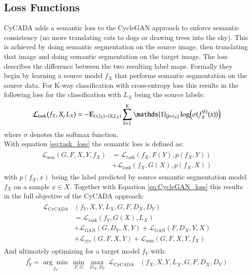 \subsection{Loss Functions}
CyCADA \cite{DBLP:journals/corr/abs-1711-03213} adds a semantic loss to the CycleGAN approach to enforce semantic consistency (no more translating cats to dogs or drawing trees into the sky). This is achieved by doing semantic segmentation on the source image, then translating that image and doing semantic segmentation on the target image. The loss describes the difference between the two resulting label maps. Formally they begin by learning a source model $f_X$ that performs semantic segmentation on the source data. For K-way classification with cross-entropy loss this results in the following loss for the classification with $L_X$ being the source labels:
\begin{align}
	\mathcal{L}_{\text{task}}(f_X, X, L_X) = -\mathbb{E}_{(x, l_X)\sim(X, L_X)}\sum_{k=1}^{K}\mathds{1}_{[k=l_X]}\log\Bigl(\sigma(f_X^{(k)}(x))\Bigr) \label{eq:task_loss} 
\end{align}
where $\sigma$ denotes the softmax function.\\
With equation \ref{eq:task_loss} the semantic loss is defined as:
\begin{align}
	\begin{split}
		\mathcal{L}_{\text{sem}}(G, F, X, Y, f_X) &= \mathcal{L}_{\text{task}}(f_X, F(Y), p(f_X, Y))\\
		&+ \mathcal{L}_{\text{task}}(f_X, G(X), p(f_X, X))
	\end{split}
\end{align}
with $p(f_X, x)$ being the label predicted by source semantic segmentation model $f_X$ on a sample $x \in X$. Together with Equation \ref{eq:CycleGAN_loss} this results in the full objective of the CyCADA approach:
\begin{align}
	\begin{split}
		\mathcal{L}_{\text{CyCADA}}&(f_Y, X, Y, L_X, G, F, D_X, D_Y)\\
		&= \mathcal{L}_{\text{task}}(f_Y, G(X), L_X)\\
		&+ \mathcal{L}_{\text{GAN}}(G, D_Y, X, Y) + \mathcal{L}_{\text{GAN}}(F, D_X, Y, X)\\
		&+ \mathcal{L}_{\text{cyc}}(G, F, X, Y) + \mathcal{L}_{\text{sem}}(G, F, X, Y, f_X)
	\end{split}
\end{align}
And ultimately optimizing for a target model $f_Y$ with:
\begin{align}
	f^*_Y = \underset{f_Y}{\arg\min} ~ \underset{F,G}{\min} ~ \underset{D_X, D_Y}{\max} ~ \mathcal{L}_{\text{CyCADA}}&(f_X, X, Y, L_X, G, F, D_X, D_Y)
\end{align}

